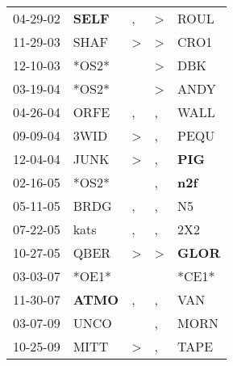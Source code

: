 \begin{supertabular}{p{0.07\textwidth}p{0.06\textwidth}p{0.02\textwidth}p{0.02\textwidth}p{0.06\textwidth}}
 04-29-02\textsuperscript{} &  \textbf{SELF\textsuperscript{}} &             , &  \textgreater &           ROUL\textsuperscript{} \\
 11-29-03\textsuperscript{} &           SHAF\textsuperscript{} &  \textgreater &  \textgreater &           CRO1\textsuperscript{} \\
 12-10-03\textsuperscript{} &                            *OS2* &               &  \textgreater &            DBK\textsuperscript{} \\
 03-19-04\textsuperscript{} &                            *OS2* &               &  \textgreater &           ANDY\textsuperscript{} \\
 04-26-04\textsuperscript{} &           ORFE\textsuperscript{} &             , &             , &           WALL\textsuperscript{} \\
 09-09-04\textsuperscript{} &           3WID\textsuperscript{} &  \textgreater &             , &           PEQU\textsuperscript{} \\
 12-04-04\textsuperscript{} &           JUNK\textsuperscript{} &  \textgreater &             , &   \textbf{PIG\textsuperscript{}} \\
 02-16-05\textsuperscript{} &                            *OS2* &               &             , &   \textbf{n2f\textsuperscript{}} \\
 05-11-05\textsuperscript{} &           BRDG\textsuperscript{} &             , &             , &             N5\textsuperscript{} \\
 07-22-05\textsuperscript{} &           kats\textsuperscript{} &             , &             , &            2X2\textsuperscript{} \\
 10-27-05\textsuperscript{} &           QBER\textsuperscript{} &  \textgreater &  \textgreater &  \textbf{GLOR\textsuperscript{}} \\
 03-03-07\textsuperscript{} &                            *OE1* &               &               &                            *CE1* \\
 11-30-07\textsuperscript{} &  \textbf{ATMO\textsuperscript{}} &             , &             , &            VAN\textsuperscript{} \\
 03-07-09\textsuperscript{} &           UNCO\textsuperscript{} &               &             , &           MORN\textsuperscript{} \\
 10-25-09\textsuperscript{} &           MITT\textsuperscript{} &  \textgreater &             , &           TAPE\textsuperscript{} \\

\end{supertabular}
